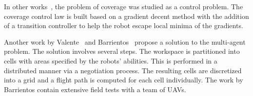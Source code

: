 \documentclass[../main.tex]{subfiles}
\begin{document}
In other works~\cite{atincc2013supervised,hussein2007effective,panagou2014vision}, the problem of coverage was studied as a control problem. The coverage control law is built based on a gradient decent method with the addition of a transition controller to help the robot escape local minima of the gradients. 

Another work by Valente~\cite{valente2011multi} and Barrientos~\cite{barrientos2011aerial} propose a solution to the multi-agent problem. The solution involves several steps. The workspace is partitioned into cells with areas specified by the robots' abilities. This is performed in a distributed manner via a negotiation process. The resulting cells are discretized into a grid and a flight path is computed for each cell individually. The work by Barrientos contain extensive field tests with a team of UAVs.



\end{document}
